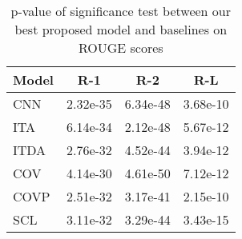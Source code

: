 				\begin{table}[th!]
				\begin{center}
				\small
						\begin{tabular}{|l|c|c|c|}
						\hline
						Model &   R-1 & R-2 & R-L \\
						\hline
						CNN &  2.32e-35 & 6.34e-48 & 3.68e-10 \\
						ITA &  6.14e-34 & 2.12e-48 & 5.67e-12 \\
						ITDA & 2.76e-32 & 4.52e-44 & 3.94e-12 \\
						COV	& 4.14e-30 & 4.61e-50 & 7.12e-12 \\
						COVP & 2.51e-32 & 3.17e-41 & 2.15e-10 \\
						SCL	& 3.11e-32 & 3.29e-44 & 3.43e-15 \\
						\hline
						\end{tabular}
				\caption{p-value of significance test between our best proposed model and baselines
				on ROUGE scores}
				\label{tab:ttest}
				\end{center}
				\end{table}
